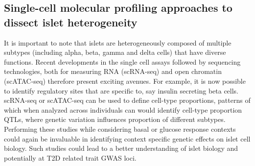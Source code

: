 \subsection{Single-cell molecular profiling approaches to dissect islet heterogeneity}
It is important to note that islets are heterogeneously composed of multiple subtypes (including alpha, beta, gamma and delta cells) that have diverse functions. Recent developments in the single cell assays followed by sequencing technologies, both for measuring RNA (scRNA-seq) and open chromatin (scATAC-seq) therefore present exciting avenues. For example, it is now possible to identify regulatory sites that are specific to, say insulin secreting beta cells. scRNA-seq or scATAC-seq can be used to define cell-type proportions, patterns of which when analyzed across individuals can would identify cell-type proportion QTLs, where genetic variation influences proportion of different subtypes. Performing these studies while considering basal or glucose response contexts could again be invaluable in identifying context specific genetic effects on islet cell biology. Such studies could lead to a better understanding of islet biology and potentially at T2D related trait GWAS loci.         
        
